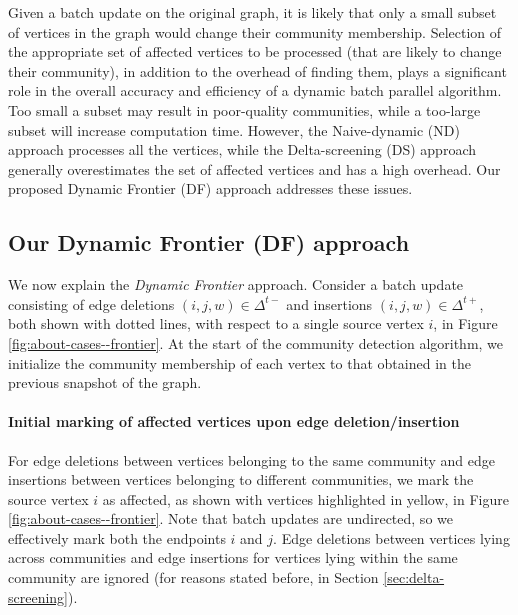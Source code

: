 Given a batch update on the original graph, it is likely that only a small subset of vertices in the graph would change their community membership. Selection of the appropriate set of affected vertices to be processed (that are likely to change their community), in addition to the overhead of finding them, plays a significant role in the overall accuracy and efficiency of a dynamic batch parallel algorithm. Too small a subset may result in poor-quality communities, while a too-large subset will increase computation time. However, the Naive-dynamic (ND) approach processes all the vertices, while the Delta-screening (DS) approach generally overestimates the set of affected vertices and has a high overhead. Our proposed Dynamic Frontier (DF) approach addresses these issues.




\subsection{Our Dynamic Frontier (DF) approach}
\label{sec:frontier}

We now explain the \textit{Dynamic Frontier} approach. Consider a batch update consisting of edge deletions $(i, j, w) \in \Delta^{t-}$ and insertions $(i, j, w) \in \Delta^{t+}$, both shown with dotted lines, with respect to a single source vertex $i$, in Figure \ref{fig:about-cases--frontier}. At the start of the community detection algorithm, we initialize the community membership of each vertex to that obtained in the previous snapshot of the graph.




\paragraph{Initial marking of affected vertices upon edge deletion/insertion}

For edge deletions between vertices belonging to the same community and edge insertions between vertices belonging to different communities, we mark the source vertex $i$ as affected, as shown with vertices highlighted in yellow, in Figure \ref{fig:about-cases--frontier}. Note that batch updates are undirected, so we effectively mark both the endpoints $i$ and $j$. Edge deletions between vertices lying across communities and edge insertions for vertices lying within the same community are ignored (for reasons stated before, in Section \ref{sec:delta-screening}).

